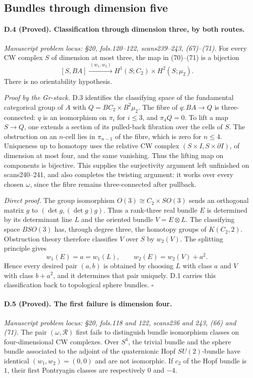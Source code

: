 \subsection{Bundles through dimension five}

\paragraph{D.4 (Proved). Classification through dimension three, by both routes.}
\emph{Manuscript problem locus: \S20, fols.120--122, scans239--243, (67)--(71).}
For every CW complex $S$ of dimension at most three, the map in (70)--(71) is a bijection
\[
[S,BA]\xrightarrow{\ (w_1,w_2)\ }
 H^1(S;C_2)\times H^2(S;\mu_2).
\]
There is no orientability hypothesis.

\emph{Proof by the Gr-stack.} D.3 identifies the classifying space of the fundamental categorical group of $A$ with $Q=BC_2\times B^2\mu_2$. The fibre of $q:BA\to Q$ is three-connected: $q$ is an isomorphism on $\pi_i$ for $i\leq3$, and $\pi_4Q=0$. To lift a map $S\to Q$, one extends a section of its pulled-back fibration over the cells of $S$. The obstruction on an $n$-cell lies in $\pi_{n-1}$ of the fibre, which is zero for $n\leq4$. Uniqueness up to homotopy uses the relative CW complex $(S\times I,S\times\partial I)$, of dimension at most four, and the same vanishing. Thus the lifting map on components is bijective. This supplies the surjectivity argument left unfinished on scans240--241, and also completes the twisting argument: it works over every chosen $\omega$, since the fibre remains three-connected after pullback.

\emph{Direct proof.} The group isomorphism
$O(3)\cong C_2\times SO(3)$ sends an orthogonal matrix $g$ to $(\det g,(\det g)g)$. Thus a rank-three real bundle $E$ is determined by its determinant line $L$ and the oriented bundle $V=E\otimes L$. The classifying space $BSO(3)$ has, through degree three, the homotopy groups of $K(C_2,2)$. Obstruction theory therefore classifies $V$ over $S$ by $w_2(V)$. The splitting principle gives
\[
w_1(E)=a=w_1(L),\qquad w_2(E)=w_2(V)+a^2.
\]
Hence every desired pair $(a,b)$ is obtained by choosing $L$ with class $a$ and $V$ with class $b+a^2$, and it determines that pair uniquely. D.1 carries this classification back to topological sphere bundles. \hfill$\square$

\paragraph{D.5 (Proved). The first failure is dimension four.}
\emph{Manuscript problem locus: \S20, fols.118 and 122, scans236 and 243, (66) and (71).}
The pair $(\omega,\mathcal R)$ first fails to distinguish bundle isomorphism classes on four-dimensional CW complexes. Over $S^4$, the trivial bundle and the sphere bundle associated to the adjoint of the quaternionic Hopf $SU(2)$-bundle have identical $(w_1,w_2)=(0,0)$ and are not isomorphic. If $c_2$ of the Hopf bundle is $1$, their first Pontryagin classes are respectively $0$ and $-4$.

